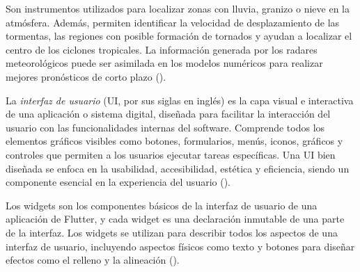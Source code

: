 \begin{definition}
Son instrumentos utilizados para localizar zonas con lluvia, granizo o nieve en la atmósfera. Además, permiten identificar la velocidad de desplazamiento de las tormentas, las regiones con posible formación de tornados y ayudan a localizar el centro de los ciclones tropicales. La información generada por los radares meteorológicos puede ser asimilada en los modelos numéricos para realizar mejores pronósticos de corto plazo (\cite{smn2025}).
\end{definition}

\begin{definition}
La \textit{interfaz de usuario} (UI, por sus siglas en inglés) es la capa visual e interactiva de una aplicación o sistema digital, diseñada para facilitar la interacción del usuario con las funcionalidades internas del software. Comprende todos los elementos gráficos visibles como botones, formularios, menús, iconos, gráficos y controles que permiten a los usuarios ejecutar tareas específicas. Una UI bien diseñada se enfoca en la usabilidad, accesibilidad, estética y eficiencia, siendo un componente esencial en la experiencia del usuario (\cite{shneiderman}).
\end{definition}

\begin{definition}[Widget]
Los widgets son los componentes básicos de la interfaz de usuario de una aplicación de Flutter, y cada widget es una declaración inmutable de una parte de la interfaz. Los widgets se utilizan para describir todos los aspectos de una interfaz de usuario, incluyendo aspectos físicos como texto y botones para diseñar efectos como el relleno y la alineación (\cite{flutter_multiplataforma}). 
\end{definition}










